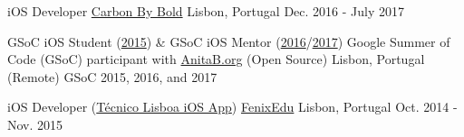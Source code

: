 \begin{cventries}

  \cventryShort
    {iOS Developer}
    {\href{https://www.carbonbybold.com/pt-pt/}{Carbon By Bold}}
    {Lisbon, Portugal}
    {Dec. 2016 - July 2017}

  \cventryShort
    {GSoC iOS Student (\href{https://docs.google.com/presentation/d/1yv4XuNNpTgDkyOjL9SSjGe7PSZuwpbah42mQCACxdXQ/}{2015}) \& GSoC iOS Mentor (\href{https://summerofcode.withgoogle.com/archive/2016/projects/5509901874888704/}{2016}/\href{https://summerofcode.withgoogle.com/archive/2017/projects/5508656065937408/}{2017})}
    {Google Summer of Code (GSoC) participant with \href{http://anitaborg.org/}{AnitaB.org} (Open Source)}
    {Lisbon, Portugal (Remote)}
    {GSoC 2015, 2016, and 2017}
    
  \cventryShort
    {iOS Developer (\href{https://apps.apple.com/us/app/tecnico-lisboa/id959976468}{Técnico Lisboa iOS App})}
    {\href{http://fenixedu.org/}{FenixEdu}}
    {Lisbon, Portugal}
    {Oct. 2014 - Nov. 2015}

\end{cventries}
